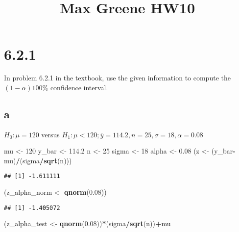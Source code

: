 \documentclass[]{article}
\title{Max Greene HW10}
\author{}
\date{}
\newenvironment{Shaded}{\begin{snugshade}}{\end{snugshade}}
\newcommand{\KeywordTok}[1]{\textcolor[rgb]{0.13,0.29,0.53}{\textbf{#1}}}
\newcommand{\DecValTok}[1]{\textcolor[rgb]{0.00,0.00,0.81}{#1}}
\newcommand{\FloatTok}[1]{\textcolor[rgb]{0.00,0.00,0.81}{#1}}
\newcommand{\StringTok}[1]{\textcolor[rgb]{0.31,0.60,0.02}{#1}}
\newcommand{\OperatorTok}[1]{\textcolor[rgb]{0.81,0.36,0.00}{\textbf{#1}}}
\newcommand{\NormalTok}[1]{#1}
\begin{document}
\maketitle

\section{6.2.1}\label{section}

In problem 6.2.1 in the textbook, use the given information to compute
the \((1-\alpha)100\%\) confidence interval.

\subsection{a}\label{a}

\(H_0 : \mu=120\) versus
\(H_1 : \mu < 120 ; \bar{y}=114.2,n=25, \sigma =18, \alpha= 0.08\)

\begin{Shaded}
\begin{Highlighting}[]
\NormalTok{mu <-}\StringTok{ }\DecValTok{120} 
\NormalTok{y_bar <-}\StringTok{ }\FloatTok{114.2}
\NormalTok{n <-}\StringTok{ }\DecValTok{25}
\NormalTok{sigma <-}\StringTok{ }\DecValTok{18}
\NormalTok{alpha <-}\StringTok{ }\FloatTok{0.08}
\NormalTok{(z <-}\StringTok{ }\NormalTok{(y_bar}\OperatorTok{-}\NormalTok{mu)}\OperatorTok{/}\NormalTok{(sigma}\OperatorTok{/}\KeywordTok{sqrt}\NormalTok{(n)))}
\end{Highlighting}
\end{Shaded}

\begin{verbatim}
## [1] -1.611111
\end{verbatim}

\begin{Shaded}
\begin{Highlighting}[]
\NormalTok{(z_alpha_norm <-}\StringTok{ }\KeywordTok{qnorm}\NormalTok{(}\FloatTok{0.08}\NormalTok{))}
\end{Highlighting}
\end{Shaded}

\begin{verbatim}
## [1] -1.405072
\end{verbatim}

\begin{Shaded}
\begin{Highlighting}[]
\NormalTok{(z_alpha_test <-}\StringTok{ }\KeywordTok{qnorm}\NormalTok{(}\FloatTok{0.08}\NormalTok{))}\OperatorTok{*}\NormalTok{(sigma}\OperatorTok{/}\KeywordTok{sqrt}\NormalTok{(n))}\OperatorTok{+}\NormalTok{mu}
\end{Highlighting}
\end{Shaded}
\end{document}
